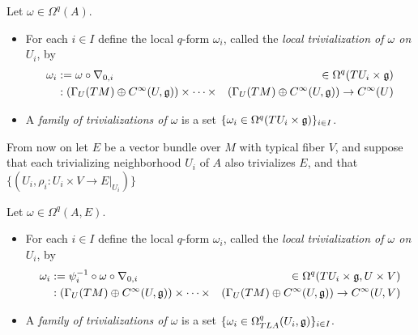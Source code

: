 \begin{definition}
Let $\omega \in \Omega^q(A)$.
    \begin{itemize}
    
    \item For each $i \in I$ define the local $q$-form $\omega_i$, called the \emph{local trivialization of $\omega$ on $U_i$}, by
    \begin{align}
        \omega_i &:= \omega \circ \nabla_{0, i}  & \in \Omega^q(TU_i\times \mathfrak{g})\\
        &:\left( \Gamma_U(TM)\oplus C^\infty(U, \mathfrak{g}) \right) \times \cdots \times &\left( \Gamma_U(TM)\oplus C^\infty(U, \mathfrak{g}) \right) \to C^\infty(U)
    \end{align}
    
    \item A \emph{family of trivializations of $\omega$} is a set $\{\omega_i \in \Omega^q(TU_i \times \mathfrak{g})\}_{i \in I}$.
    
    \end{itemize}

\end{definition}

From now on let $E$ be a vector bundle over $M$ with typical fiber $V$, and suppose that each trivializing neighborhood $U_i$ of $A$ also trivializes $E$, and that $\{(U_i, \rho_i: U_i \times V \to E|_{U_i})\}$

\begin{definition}
Let $\omega \in \Omega^q(A, E)$.
    \begin{itemize}
    
    \item For each $i \in I$ define the local $q$-form $\omega_i$, called the \emph{local trivialization of $\omega$ on $U_i$}, by
    \begin{align}
        \omega_i &:= \psi_i^{-1} \circ \omega \circ \nabla_{0, i}  & \in \Omega^q(TU_i\times \mathfrak{g}, U \times V)\\
        &:\left( \Gamma_U(TM)\oplus C^\infty(U, \mathfrak{g}) \right) \times \cdots \times &\left( \Gamma_U(TM)\oplus C^\infty(U, \mathfrak{g}) \right) \to C^\infty(U, V)
    \end{align}
    
    \item A \emph{family of trivializations of $\omega$} is a set $\{\omega_i \in \Omega^q_{TLA}(U_i, \mathfrak{g})\}_{i \in I}$.
    
    \end{itemize}

\end{definition}

